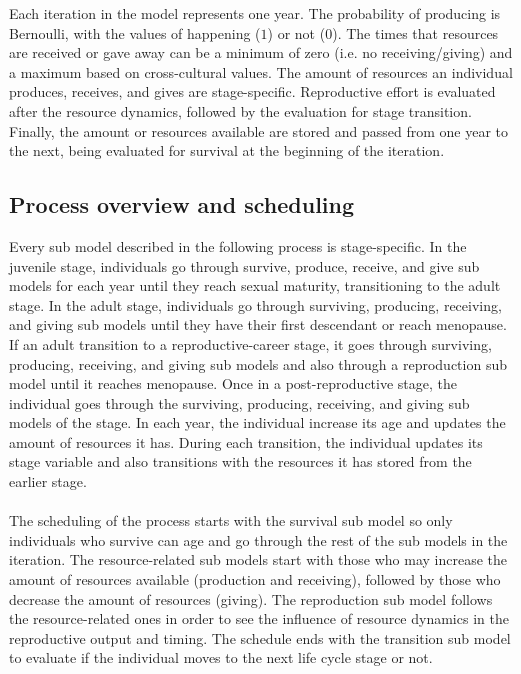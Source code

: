 \documentclass{article}
\begin{document}
Each iteration in the model represents one year. The probability  of producing is Bernoulli, with the values of happening ($1$) or not ($0$). The times that resources are received or gave away can be a minimum of zero (i.e. no receiving/giving) and a maximum based on cross-cultural values. The amount of resources an individual produces, receives, and gives are stage-specific. Reproductive effort is evaluated after the resource dynamics, followed by the evaluation for stage transition. Finally, the amount or resources available are stored and passed from one year to the next, being evaluated for survival at the beginning of the iteration.

\subsection{Process overview and scheduling}

Every sub model described in the following process is stage-specific. In the juvenile stage, individuals go through survive, produce, receive, and give sub models for each year until they reach sexual maturity, transitioning to the adult stage. In the adult stage, individuals go through surviving, producing, receiving, and giving sub models until they have their first descendant or reach menopause. If an adult transition to a reproductive-career stage, it goes through surviving, producing, receiving, and giving sub models and also through a reproduction sub model until it reaches menopause. Once in a post-reproductive stage, the individual goes through the surviving, producing, receiving, and giving sub models of the stage. In each year, the individual increase its age and updates the amount of resources it has. During each transition, the individual updates its stage variable and also transitions with the resources it has stored from the earlier stage.
\\\\
The scheduling of the process starts with the survival sub model so only individuals who survive can age and go through the rest of the sub models in the iteration. The resource-related sub models start with those who may increase the amount of resources available (production and receiving), followed by those who decrease the amount of resources (giving). The reproduction sub model follows the resource-related ones in order to see the influence of resource dynamics in the reproductive output and timing. The schedule ends with the transition sub model to evaluate if the individual moves to the next life cycle stage or not.
\end{document}
